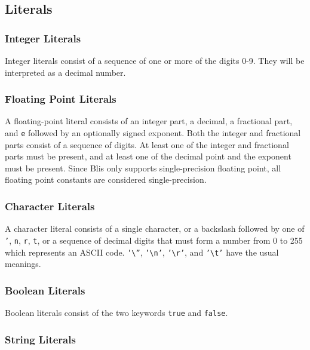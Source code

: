 \documentclass[11pt]{article}
\newcommand{\code}[1]{\texttt{#1}}
\begin{document}
\begin{multicols}{3}
\begin{itemize}
\end{itemize}
\end{multicols}

\subsection{Literals}

\subsubsection{Integer Literals}

Integer literals consist of a sequence of one or more of the digits 0-9. They will be interpreted as a decimal number.

\subsubsection{Floating Point Literals}

A floating-point literal consists of an integer part, a decimal, a fractional part, and \code{e} followed by an optionally signed exponent. Both the integer and fractional parts consist of a sequence of digits. At least one of the integer and fractional parts must be present, and at least one of the decimal point and the exponent must be present. Since Blis only supports single-precision floating point, all floating point constants are considered single-precision.

\subsubsection{Character Literals} \label{charliterals}

A character literal consists of a single character, or a backslash followed by one of \code{'}, \code{n}, \code{r}, \code{t}, or a sequence of decimal digits that must form a number from 0 to 255 which represents an ASCII code. \code{'\textbackslash''}, \code{'\textbackslash{}n'}, \code{'\textbackslash{}r'}, and \code{'\textbackslash{}t'} have the usual meanings.

\subsubsection{Boolean Literals}

Boolean literals consist of the two keywords \code{true} and \code{false}.

\subsubsection{String Literals}
\end{document}
